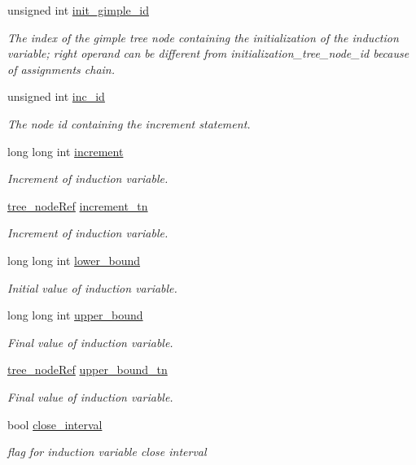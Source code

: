 \begin{DoxyCompactItemize}
unsigned int \hyperlink{classLoop_aebbecc85e705c40125f6ed400e233d1e}{init\+\_\+gimple\+\_\+id}
\begin{DoxyCompactList}\small\item\em The index of the gimple tree node containing the initialization of the induction variable; right operand can be different from initialization\+\_\+tree\+\_\+node\+\_\+id because of assignments chain. \end{DoxyCompactList}\item 
unsigned int \hyperlink{classLoop_a938693c5ccc84c12744e6da71135d695}{inc\+\_\+id}
\begin{DoxyCompactList}\small\item\em The node id containing the increment statement. \end{DoxyCompactList}\item 
long long int \hyperlink{classLoop_ab476fce933d31e27be927fde09e2b0d0}{increment}
\begin{DoxyCompactList}\small\item\em Increment of induction variable. \end{DoxyCompactList}\item 
\hyperlink{tree__node_8hpp_a6ee377554d1c4871ad66a337eaa67fd5}{tree\+\_\+node\+Ref} \hyperlink{classLoop_a45579348a2902d005b35360069b32f75}{increment\+\_\+tn}
\begin{DoxyCompactList}\small\item\em Increment of induction variable. \end{DoxyCompactList}\item 
long long int \hyperlink{classLoop_a9cc14c2a53623b781857a1cdd9565e73}{lower\+\_\+bound}
\begin{DoxyCompactList}\small\item\em Initial value of induction variable. \end{DoxyCompactList}\item 
long long int \hyperlink{classLoop_a67fc0cacd5dfe3efec9ca8183834f7fb}{upper\+\_\+bound}
\begin{DoxyCompactList}\small\item\em Final value of induction variable. \end{DoxyCompactList}\item 
\hyperlink{tree__node_8hpp_a6ee377554d1c4871ad66a337eaa67fd5}{tree\+\_\+node\+Ref} \hyperlink{classLoop_adda920ba0fb698a6ab56fb1d819b699f}{upper\+\_\+bound\+\_\+tn}
\begin{DoxyCompactList}\small\item\em Final value of induction variable. \end{DoxyCompactList}\item 
bool \hyperlink{classLoop_aec746ac0a1f2671127e550763cf644ee}{close\+\_\+interval}
\begin{DoxyCompactList}\small\item\em flag for induction variable close interval \end{DoxyCompactList}\end{DoxyCompactItemize}
